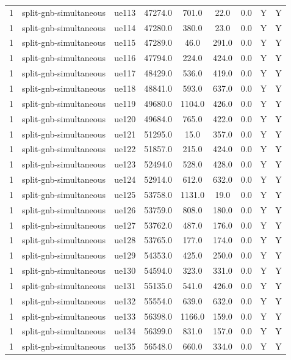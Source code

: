 \begin{table}[ht]
\begin{tabular}{|c|c|c|c|c|c|c|c|c|}
1 & split-gnb-simultaneous & ue113 & 47274.0 & 701.0 & 22.0 & 0.0 & Y & Y \\
1 & split-gnb-simultaneous & ue114 & 47280.0 & 380.0 & 23.0 & 0.0 & Y & Y \\
1 & split-gnb-simultaneous & ue115 & 47289.0 & 46.0 & 291.0 & 0.0 & Y & Y \\
1 & split-gnb-simultaneous & ue116 & 47794.0 & 224.0 & 424.0 & 0.0 & Y & Y \\
1 & split-gnb-simultaneous & ue117 & 48429.0 & 536.0 & 419.0 & 0.0 & Y & Y \\
1 & split-gnb-simultaneous & ue118 & 48841.0 & 593.0 & 637.0 & 0.0 & Y & Y \\
1 & split-gnb-simultaneous & ue119 & 49680.0 & 1104.0 & 426.0 & 0.0 & Y & Y \\
1 & split-gnb-simultaneous & ue120 & 49684.0 & 765.0 & 422.0 & 0.0 & Y & Y \\
1 & split-gnb-simultaneous & ue121 & 51295.0 & 15.0 & 357.0 & 0.0 & Y & Y \\
1 & split-gnb-simultaneous & ue122 & 51857.0 & 215.0 & 424.0 & 0.0 & Y & Y \\
1 & split-gnb-simultaneous & ue123 & 52494.0 & 528.0 & 428.0 & 0.0 & Y & Y \\
1 & split-gnb-simultaneous & ue124 & 52914.0 & 612.0 & 632.0 & 0.0 & Y & Y \\
1 & split-gnb-simultaneous & ue125 & 53758.0 & 1131.0 & 19.0 & 0.0 & Y & Y \\
1 & split-gnb-simultaneous & ue126 & 53759.0 & 808.0 & 180.0 & 0.0 & Y & Y \\
1 & split-gnb-simultaneous & ue127 & 53762.0 & 487.0 & 176.0 & 0.0 & Y & Y \\
1 & split-gnb-simultaneous & ue128 & 53765.0 & 177.0 & 174.0 & 0.0 & Y & Y \\
1 & split-gnb-simultaneous & ue129 & 54353.0 & 425.0 & 250.0 & 0.0 & Y & Y \\
1 & split-gnb-simultaneous & ue130 & 54594.0 & 323.0 & 331.0 & 0.0 & Y & Y \\
1 & split-gnb-simultaneous & ue131 & 55135.0 & 541.0 & 426.0 & 0.0 & Y & Y \\
1 & split-gnb-simultaneous & ue132 & 55554.0 & 639.0 & 632.0 & 0.0 & Y & Y \\
1 & split-gnb-simultaneous & ue133 & 56398.0 & 1166.0 & 159.0 & 0.0 & Y & Y \\
1 & split-gnb-simultaneous & ue134 & 56399.0 & 831.0 & 157.0 & 0.0 & Y & Y \\
1 & split-gnb-simultaneous & ue135 & 56548.0 & 660.0 & 334.0 & 0.0 & Y & Y \\

\end{tabular}
\end{table}
